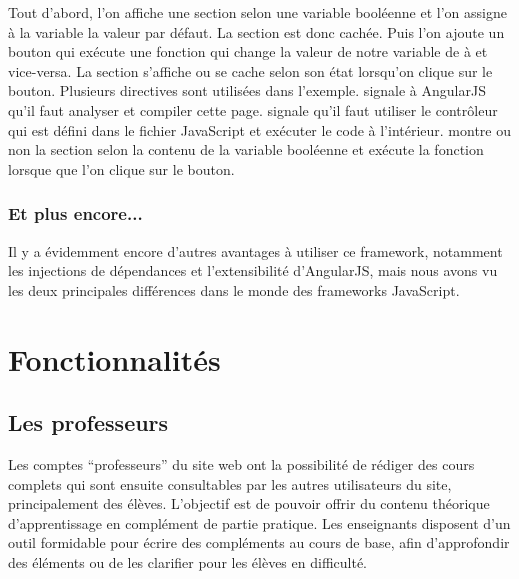 \documentclass[a4paper,10pt,twoside]{sphinxmanual}
\begin{document}
Tout d'abord, l'on affiche une section selon une variable booléenne  et l'on assigne à la variable la valeur  par défaut. La section est donc cachée. Puis l'on ajoute un bouton qui exécute une fonction qui change la valeur de notre variable  de  à  et vice-versa. La section s'affiche ou se cache selon son état lorsqu'on clique sur le bouton. Plusieurs directives sont utilisées dans l'exemple.  signale à AngularJS qu'il faut analyser et compiler cette page.  signale qu'il faut utiliser le contrôleur  qui est défini dans le fichier JavaScript et exécuter le code à l'intérieur.  montre ou non la section selon la contenu de la variable booléenne  et  exécute la fonction  lorsque que l'on clique sur le bouton.


\subsection{Et plus encore...}
\label{angularjs:et-plus-encore}
Il y a évidemment encore d'autres avantages à utiliser ce framework, notamment les injections de dépendances et l'extensibilité d'AngularJS, mais nous avons vu les deux principales différences dans le monde des frameworks JavaScript.


\chapter{Fonctionnalités}
\label{functionalities:fonctionnalites}\label{functionalities::doc}

\section{Les professeurs}
\label{functionalities:les-professeurs}
Les comptes ``professeurs'' du site web ont la possibilité de rédiger des cours complets qui sont ensuite consultables par les autres utilisateurs du site, principalement des élèves. L'objectif est de pouvoir offrir du contenu théorique d'apprentissage en complément de partie pratique. Les enseignants disposent d'un outil formidable pour écrire des compléments au cours de base, afin d'approfondir des éléments ou de les clarifier pour les élèves en difficulté.
\end{document}
